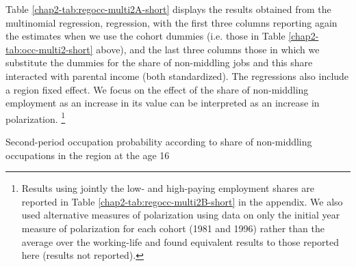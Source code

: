 Table \ref{chap2-tab:regocc-multi2A-short} displays the results obtained from the multinomial regression, regression, with the first three columns reporting again the estimates when we use the cohort dummies (i.e. those in Table \ref{chap2-tab:occ-multi2-short} above), and the last three columns those in which we substitute the dummies for the share of non-middling jobs and this share interacted with parental income (both standardized). The regressions also include a region fixed effect. We focus on the effect of the share of non-middling employment as an increase in its value can be interpreted as an increase in polarization. \footnote{Results using jointly the low- and high-paying employment shares are reported in Table \ref{chap2-tab:regocc-multi2B-short} in the appendix. We also used alternative measures of polarization using data on only the initial year measure of polarization for each cohort (1981 and 1996) rather than the average over the working-life and found equivalent results to those reported here (results not reported).} 
\begin{table}[!tb]
    \centering
    \caption{Second-period occupation probability according to share of non-middling occupations in the region at the age 16}
    \label{chap2-tab:regocc-multi2A-short}
\end{table}

